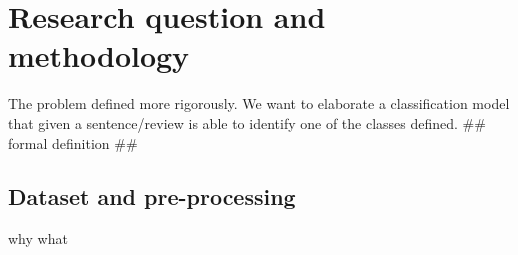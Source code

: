 \section{Research question and methodology}
The problem defined more rigorously.
We want to elaborate a classification model that given a sentence/review is able to identify one of the classes defined.
## formal definition ##


\subsection{Dataset and pre-processing}
why
what
